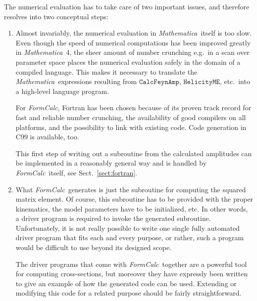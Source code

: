 \documentclass[twoside,11pt]{article}
\def\FC{\textit{FormCalc}}
\def\mma{\textit{Mathematica}}
\def\Code#1{\ensuremath{\texttt{#1}}}
\def\eg{e.g.\ }
\begin{document}
The numerical evaluation has to take care of two important issues, and 
therefore resolves into two conceptual steps:
\begin{enumerate}
\item
Almost invariably, the numerical evaluation in \mma\ itself is too slow.
Even though the speed of numerical computations has been improved greatly
in \mma\ 4, the sheer amount of number crunching \eg in a scan over
parameter space places the numerical evaluation safely in the domain of a
compiled language.  This makes it necessary to translate the \mma\
expressions resulting from \Code{CalcFeynAmp}, \Code{HelicityME}, etc.\ into
a high-level language program.

For \FC, Fortran has been chosen because of its proven track record for 
fast and reliable number crunching, the availability of good compilers 
on all platforms, and the possibility to link with existing code.  
Code generation in C99 is available, too.

This first step of writing out a subroutine from the calculated 
amplitudes can be implemented in a reasonably general way and is handled 
by \FC\ itself, see Sect.\ \ref{sect:fortran}.

\item
What \FC\ generates is just the subroutine for computing the squared
matrix element.  Of course, this subroutine has to be provided with the
proper kinematics, the model parameters have to be initialized, etc.  In
other words, a driver program is required to invoke the generated
subroutine.  Unfortunately, it is not really possible to write one single
fully automated driver program that fits each and every purpose, or
rather, such a program would be difficult to use beyond its designed
scope.

The driver programs that come with \FC\ together are a powerful tool for
computing cross-sections, but moreover they have expressly been written
to give an example of how the generated code can be used.  Extending or
modifying this code for a related purpose should be fairly
straightforward.
\end{enumerate}
\end{document}
